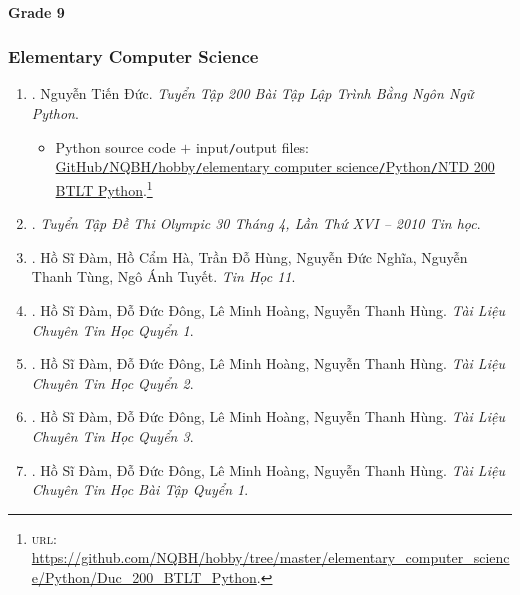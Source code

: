 \documentclass{article}
\begin{document}
\paragraph{Grade 9}

\subsubsection{Elementary Computer Science}

\begin{enumerate}
	\item \cite{Duc_200_BT_Python}. Nguyễn Tiến Đức. {\it Tuyển Tập 200 Bài Tập Lập Trình Bằng Ngôn Ngữ Python}.\hfill{\sf[reading]}
	\begin{itemize}
		\item Python source code $+$ input{\tt/}output files:\\\href{https://github.com/NQBH/hobby/tree/master/elementary_computer_science/Python/Duc_200_BTLT_Python}{GitHub{\tt/}NQBH{\tt/}hobby{\tt/}elementary computer science{\tt/}Python{\tt/}NTD 200 BTLT Python}.\footnote{\textsc{url}: \url{https://github.com/NQBH/hobby/tree/master/elementary_computer_science/Python/Duc_200_BTLT_Python}.}
	\end{itemize}
	
	\item \cite{Olympic30-4_2010_Tin_Hoc}. {\it Tuyển Tập Đề Thi Olympic 30 Tháng 4, Lần Thứ XVI -- 2010 Tin học}.\hfill{\sf[reading]}
	
	\item \cite{SGK_Tin_Hoc_11}. Hồ Sĩ Đàm, Hồ Cẩm Hà, Trần Đỗ Hùng, Nguyễn Đức Nghĩa, Nguyễn Thanh Tùng, Ngô Ánh Tuyết. {\it Tin Học 11}.\hfill{\sf[done]}
	
	\item \cite{TL_chuyen_Tin_quyen_1}. Hồ Sĩ Đàm, Đỗ Đức Đông, Lê Minh Hoàng, Nguyễn Thanh Hùng. {\it Tài Liệu Chuyên Tin Học Quyển 1}.\hfill{\sf[reading]}
	
	\item \cite{TL_chuyen_Tin_quyen_2}. Hồ Sĩ Đàm, Đỗ Đức Đông, Lê Minh Hoàng, Nguyễn Thanh Hùng. {\it Tài Liệu Chuyên Tin Học Quyển 2}.\hfill{\sf[reading]}
	
	\item \cite{TL_chuyen_Tin_quyen_3}. Hồ Sĩ Đàm, Đỗ Đức Đông, Lê Minh Hoàng, Nguyễn Thanh Hùng. {\it Tài Liệu Chuyên Tin Học Quyển 3}.\hfill{\sf[reading]}
	
	\item \cite{TL_chuyen_Tin_BT_quyen_1}. Hồ Sĩ Đàm, Đỗ Đức Đông, Lê Minh Hoàng, Nguyễn Thanh Hùng. {\it Tài Liệu Chuyên Tin Học Bài Tập Quyển 1}.
	

\end{enumerate}
\end{document}
